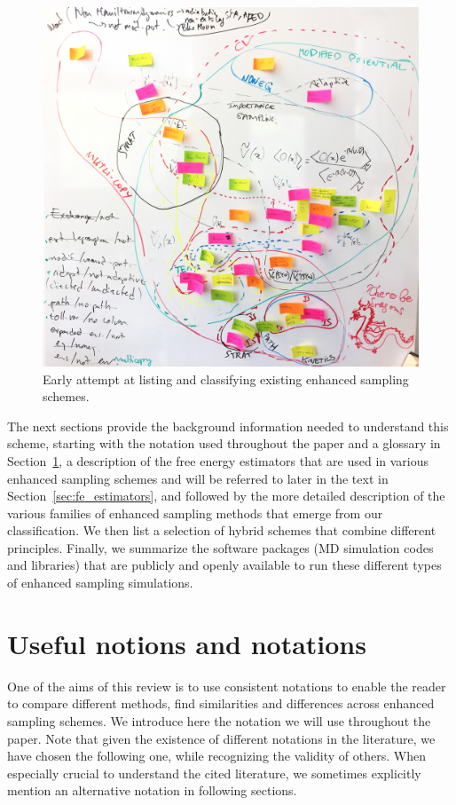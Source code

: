 \documentclass[9pt,review]{livecoms}
\begin{document}
\begin{figure}[!htb]
  \includegraphics[width=0.99\columnwidth] {Figures/Venn_Diagram_Early_Attempt.jpeg}
  \caption{Early attempt at listing and classifying existing enhanced sampling schemes.}
  \label{fig:VennD}
\end{figure}

The next sections provide the background information needed to understand this scheme, starting with the notation used throughout the paper and a glossary in Section~\ref{sec:Notion_Notation}, a description of the free energy estimators that are used in various enhanced sampling schemes and will be referred to later in the text in Section~\ref{sec:fe_estimators}, and followed by the more detailed description of the various families of enhanced sampling methods that emerge from our classification. We then list a selection of hybrid schemes that combine different principles. Finally, we summarize the software packages (MD simulation codes and libraries) that are publicly and openly available to run these different types of enhanced sampling simulations.

\section{Useful notions and notations}
\label{sec:Notion_Notation}

One of the aims of this review is to use consistent notations to enable the reader to compare different methods, find similarities and differences across enhanced sampling
schemes. We introduce here the notation we will use throughout the paper. Note that given the existence of different notations in the literature, we have chosen the following one, while recognizing the validity of others. When especially crucial to understand the cited literature, we sometimes explicitly mention an alternative notation in following sections.
\end{document}
